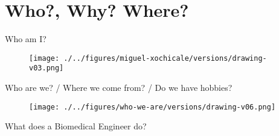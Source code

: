\section{Who?, Why? Where?}



{
\begin{frame}{Who am I?}

  \begin{figure}
  \centering
  \texttt{[image: ./../figures/miguel-xochicale/versions/drawing-v03.png]}
  \end{figure}

\end{frame}
}



{
\begin{frame}{Who are we? / Where we come from? / Do we have hobbies?}

  \begin{figure}
  \centering
  \texttt{[image: ./../figures/who-we-are/versions/drawing-v06.png]}
  \end{figure}

\end{frame}
}



{
\begin{frame}{}

\BigSizeFont
What does a Biomedical Engineer do?
\end{frame}
}




